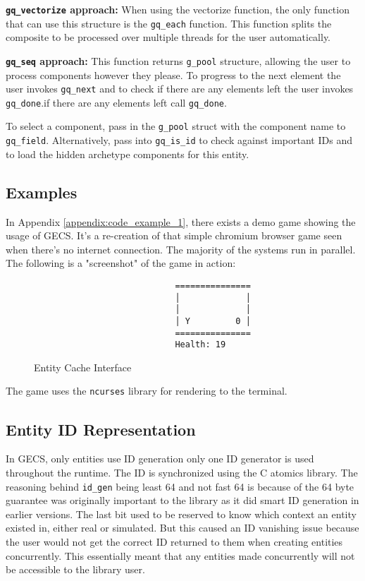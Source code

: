 \textbf{\texttt{gq\_vectorize} approach:} When using the vectorize function, the only function that can use this structure is the \texttt{gq\_each} function. This function splits the composite to be processed over multiple threads for the user automatically.

\textbf{\texttt{gq\_seq} approach:} This function returns \texttt{g\_pool} structure, allowing the user to process components however they please. To progress to the next element the user invokes \texttt{gq\_next} and to check if there are any elements left the user invokes \texttt{gq\_done}.if there are any elements left call \texttt{gq\_done}.

To select a component, pass in the \texttt{g\_pool} struct with the component name to \texttt{gq\_field}. Alternatively, pass into \texttt{gq\_is\_id} to check against important IDs and to load the hidden archetype components for this entity. 

\subsection{Examples}
In Appendix \ref{appendix:code_example_1}, there exists a demo game showing the usage of GECS. It's a re-creation of that simple chromium browser game seen when there's no internet connection. The majority of the systems run in parallel. The following is a "screenshot" of the game in action:

\begin{figure}[H]
    \begin{verbatim}
                            ===============
                            │             │
                            │             │
                            │ Y         0 │
                            ===============
                            Health: 19
    \end{verbatim}
\caption{Entity Cache Interface}
\label{code:component_retrieval}
\end{figure}

The game uses the \texttt{ncurses} library for rendering to the terminal. 

\subsection{Entity ID Representation}
In GECS, only entities use ID generation only one ID generator is used throughout the runtime. The ID is synchronized using the C atomics library. The reasoning behind \texttt{id\_gen} being least 64 and not fast 64 is because of the 64 byte guarantee was originally important to the library as it did smart ID generation in earlier versions. The last bit used to be reserved to know which context an entity existed in, either real or simulated. But this caused an ID vanishing issue because the user would not get the correct ID returned to them when creating entities concurrently. This essentially meant that any entities made concurrently will not be accessible to the library user.

